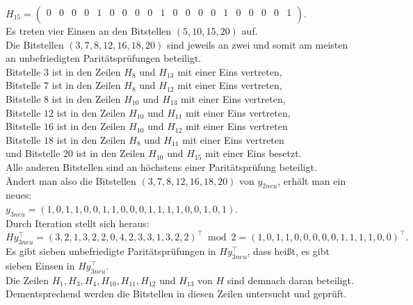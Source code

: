 \begin{Beispiel}
    $H_{15}=\left( \begin{array}{rrrrrrrrrrrrrrrrrrrr}
        0 & 0 & 0 & 0 & 1 & 0 & 0 & 0 & 0 & 1 & 0 & 0 & 0 & 0 & 1 & 0 & 0 & 0 & 0 & 1 \\
       \end{array}\right). 
    $\\
    Es treten vier Einsen an den Bitstellen $(5, 10, 15, 20)$ auf.\\
    
    Die Bitstellen $(3, 7, 8, 12, 16, 18, 20)$ sind jeweils an zwei und somit am meisten an unbefriedigten Paritätsprüfungen beteiligt.\\ 
    Bitstelle $3$ ist in den Zeilen $H_8$ und $H_{13}$ mit einer Eins vertreten,\\
    Bitstelle $7$ ist in den Zeilen $H_8$ und $H_{12}$  mit einer Eins vertreten,\\
    Bitstelle $8$ ist in den Zeilen $H_{10}$ und $H_{13}$  mit einer Eins vertreten,\\ 
    Bitstelle $12$ ist in den Zeilen $H_{10}$ und $H_{11}$ mit einer Eins vertreten,\\
    Bitstelle $16$ ist in den Zeilen $H_{10}$ und $H_{12}$ mit einer Eins vertreten\\   
    Bitstelle $18$ ist in den Zeilen $H_8$ und $H_{11}$ mit einer Eins vertreten\\   
    und Bitstelle $20$ ist in den Zeilen $H_{10}$ und $H_{15}$ mit einer Eins besetzt.\\
    Alle anderen Bitstellen sind an höchstens einer Paritätsprüfung beteiligt.\\
    
    Ändert man also die Bitstellen $(3, 7, 8, 12, 16, 18, 20)$ von $y_{2neu}$, erhält man ein neues:\\
    $y_{3neu} = (1,0,1,1,0,0,1,1,0,0,0,1,1,1,1,0,0,1,0,1).$\\
    
    Durch Iteration stellt sich heraus:\\
    $Hy_{3neu}^\intercal= (3,2,1,3,2,2,0,4,2,3,3,1,3,2,2)^\intercal \bmod 2= (1,0,1,1,0,0,0,0,0,1,1,1,1,0,0)^\intercal.$\\
    
    Es gibt sieben unbefriedigte Paritätsprüfungen in $Hy_{3neu}^\intercal$,
    dass hei\ss{}t, es gibt sieben Einsen in $Hy_{3neu}^\intercal.$\\
    Die Zeilen $H_1, H_3, H_4, H_{10}, H_{11}, H_{12} $ und $H_{13}$ von $H$ sind demnach daran beteiligt.\\ 
    Dementsprechend werden die Bitstellen in diesen Zeilen untersucht und geprüft.\\
    \pagebreak
    

\end{Beispiel}
